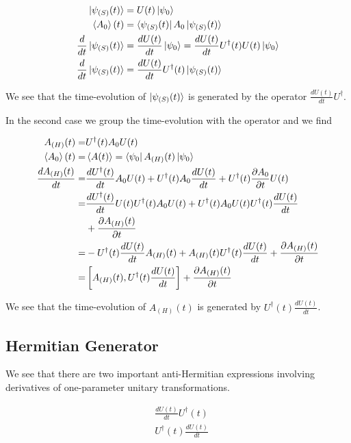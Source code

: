 \documentclass[12pt]{article}
\begin{document}
\begin{align}
\ket{\psi_{(S)}(t)} &= U(t)\ket{\psi_0}\\
\braket{A_0}(t) &= \bra{\psi_{(S)}(t)}A_0\ket{\psi_{(S)}(t)}\\
\frac{d}{dt}\ket{\psi_{(S)}(t)} &= \frac{dU(t)}{dt}\ket{\psi_0} = \frac{dU(t)}{dt}U^{\dag}(t)U(t)\ket{\psi_0}\\
\frac{d}{dt}\ket{\psi_{(S)}(t)} &= \frac{dU(t)}{dt}U^{\dag}(t)\ket{\psi_{(S)}(t)}
\end{align}

We see that the time-evolution of $\ket{\psi_{(S)}(t)}$ is generated by the operator $\frac{dU(t)}{dt}U^{\dag}$.

In the second case we group the time-evolution with the operator and we find

\begin{align}
A_{(H)}(t) =& U^{\dag}(t)A_0U(t)\\
\braket{A_0}(t) =& \braket{A(t)} = \bra{\psi_0}A_{(H)}(t)\ket{\psi_0}\\
\frac{dA_{(H)}(t)}{dt} =& \frac{dU^{\dag}(t)}{dt}A_0U(t) + U^{\dag}(t)A_0\frac{dU(t)}{dt} + U^{\dag}(t)\frac{\partial{A_0}}{\partial t}U(t)\\
=& \frac{dU^{\dag}(t)}{dt}U(t)U^{\dag}(t)A_0U(t) + U^{\dag}(t)A_0 U(t)U^{\dag}(t) \frac{dU(t)}{dt}\\
&+ \frac{\partial A_{(H)}(t)}{\partial t}\\
=& -U^{\dag}(t)\frac{dU(t)}{dt} A_{(H)}(t) + A_{(H)}(t) U^{\dag}(t)\frac{dU(t)}{dt} + \frac{\partial A_{(H)}(t)}{\partial t}\\
=& \left[A_{(H)}(t), U^{\dag}(t)\frac{dU(t)}{dt}\right] + \frac{\partial A_{(H)}(t)}{\partial t}
\end{align}

We see that the time-evolution of $A_{(H)}(t)$ is generated by $U^{\dag}(t)\frac{dU(t)}{dt}$.

\subsection{Hermitian Generator}

We see that there are two important anti-Hermitian expressions involving derivatives of one-parameter unitary transformations.

\begin{align}
&\frac{dU(t)}{dt}U^{\dag}(t)\\
&U^{\dag}(t)\frac{dU(t)}{dt}
\end{align}
\end{document}

